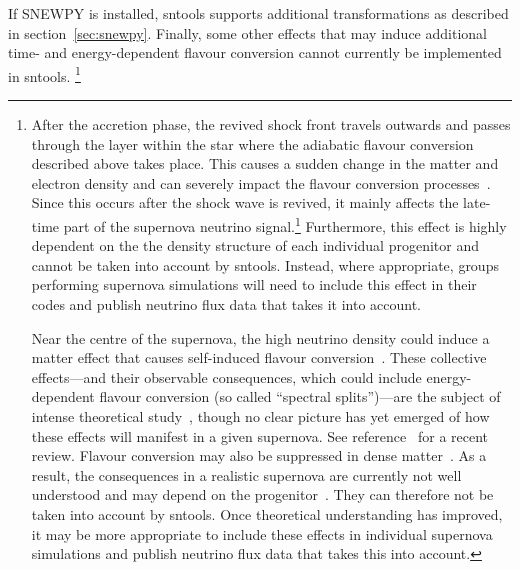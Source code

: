 \documentclass[11pt, oneside]{article}
\begin{document}
If SNEWPY is installed, sntools supports additional transformations as described in section~\ref{sec:snewpy}.
Finally, some other effects that may induce additional time- and energy-dependent flavour conversion cannot currently be implemented in sntools.%
\footnote{
After the accretion phase, the revived shock front travels outwards and passes through the layer within the star where the adiabatic flavour conversion described above takes place.
This causes a sudden change in the matter and electron density and can severely impact the flavour conversion processes~\cite{Schirato2002}.
Since this occurs after the shock wave is revived, it mainly affects the late-time part of the supernova neutrino signal.\footnote{For the Totani model, this effect is expected to become relevant more than \SI{1}{s} after core-bounce~\cite{Fogli2005}. Most other computer simulations don’t extend out to more than a few \SI{100}{ms} and would thus likely not exhibit this effect.}
Furthermore, this effect is highly dependent on the the density structure of each individual progenitor and cannot be taken into account by sntools.
Instead, where appropriate, groups performing supernova simulations will need to include this effect in their codes and publish neutrino flux data that takes it into account.

Near the centre of the supernova, the high neutrino density could induce a matter effect that causes self-induced flavour conversion~\cite{Duan2006a,Duan2006}.
These collective effects---and their observable consequences, which could include energy-dependent flavour conversion (so called “spectral splits”)---are the subject of intense theoretical study~\cite{Raffelt2007,Dasgupta2009,Friedland2010,Duan2011,Izaguirre2017}, though no clear picture has yet emerged of how these effects will manifest in a given supernova.
See reference~\cite{Chakraborty2016} for a recent review.
Flavour conversion may also be suppressed in dense matter~\cite{Esteban-Pretel2008,Zaizen2018}.
As a result, the consequences in a realistic supernova are currently not well understood and may depend on the progenitor~\cite{Chakraborty2014}.
They can therefore not be taken into account by sntools.
Once theoretical understanding has improved, it may be more appropriate to include these effects in individual supernova simulations and publish neutrino flux data that takes this into account.

}
\end{document}
